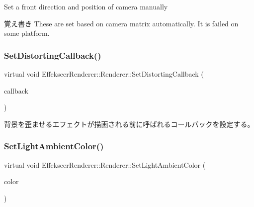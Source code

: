 Set a front direction and position of camera manually 

\begin{DoxyNote}{覚え書き}
These are set based on camera matrix automatically. It is failed on some platform. 
\end{DoxyNote}
\mbox{\label{class_effekseer_renderer_1_1_renderer_a8806b5a83c5ea73e09662f4a0869f8f0}} 
\subsubsection{\texorpdfstring{Set\+Distorting\+Callback()}{SetDistortingCallback()}}
{\footnotesize\ttfamily virtual void Effekseer\+Renderer\+::\+Renderer\+::\+Set\+Distorting\+Callback (\begin{DoxyParamCaption}\item[{\mbox{\hyperlink{class_effekseer_renderer_1_1_distorting_callback}{Distorting\+Callback}} $\ast$}]{callback }\end{DoxyParamCaption})\hspace{0.3cm}{\ttfamily [pure virtual]}}



背景を歪ませるエフェクトが描画される前に呼ばれるコールバックを設定する。 

\mbox{\label{class_effekseer_renderer_1_1_renderer_a8c177a08c1765e8a02ba72fae7b33935}} 
\subsubsection{\texorpdfstring{Set\+Light\+Ambient\+Color()}{SetLightAmbientColor()}}
{\footnotesize\ttfamily virtual void Effekseer\+Renderer\+::\+Renderer\+::\+Set\+Light\+Ambient\+Color (\begin{DoxyParamCaption}\item[{const \+::\mbox{\hyperlink{struct_effekseer_1_1_color}{Effekseer\+::\+Color}} \&}]{color }\end{DoxyParamCaption})\hspace{0.3cm}{\ttfamily [pure virtual]}}



